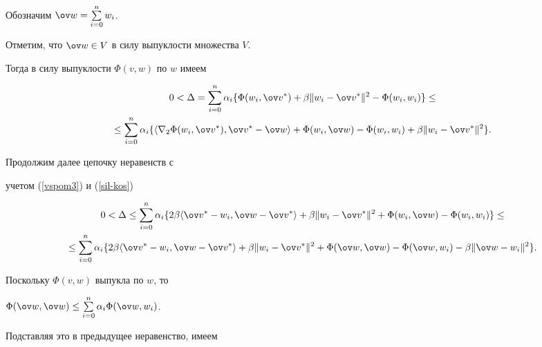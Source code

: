 \begin{pf}
Обозначим $\ov w = \sum\limits_{i=0}^n w_i$.


Отметим, что $\ov w\in V$ в силу выпуклости множества $V$.


Тогда в силу выпуклости $\Phi(v,w)$ по $w$ имеем


\begin{multline*}


0<\Delta = \sum_{i=0}^n \alpha_i


\{\Phi(w_i,\ov v^*) + \beta \|w_i - \ov v^*\|^2 -


\Phi(w_i,w_i)\} \leq \\


%


\leq \sum_{i=0}^n \alpha_i


\{\langle \nabla_2\Phi(w_i,\ov v^*),\ov v^*


- \ov w\rangle + \Phi(w_i,\ov w) - \Phi(w_i,w_i) +


\beta \|w_i - \ov v^*\|^2 \}.


\end{multline*}


Продолжим далее цепочку неравенств с


учетом (\ref{vspom3}) и (\ref{sil-kos})


\begin{multline*}


0<\Delta\leq \sum_{i=0}^n \alpha_i \{


2 \beta \langle \ov v^* - w_i, \ov w-\ov v^*\rangle +


\beta \|w_i - \ov v^*\|^2 + \Phi(w_i,\ov w) -


\Phi(w_i,w_i)\}\leq \\


%


\leq


\sum_{i=0}^n \alpha_i \{


2 \beta \langle \ov v^* - w_i, \ov w-\ov v^*\rangle +


\beta \|w_i - \ov v^*\|^2 + \Phi(\ov w,\ov w) -


\Phi(\ov w,w_i) - \beta \|\ov w - w_i\|^2\}.


\end{multline*}


Поскольку $\Phi(v,w)$ выпукла по $w$, то


$\Phi(\ov w,\ov w)\le \sum\limits_{i=0}^n \alpha_i \Phi(\ov w,w_i)$.


Подставляя это в предыдущее неравенство, имеем


\begin{multline*}



\end{multline*}
\end{pf}
